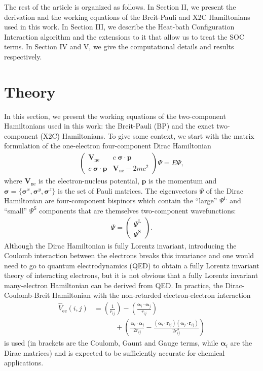 \documentclass[10pt,aps,prb,twocolumn,amsmath,amssymb,superscriptaddress]{revtex4-1}
\renewcommand\b[1]{\ensuremath{\mathbf{#1}}}
\newcommand\B[1]  {\ensuremath{\pmb #1}}
\newcommand\equ[2]{\begin{align}#2\label{#1}\end{align}}
\begin{document}
The rest of the article is organized as follows.
In Section II, we present the derivation and the working equations of the Breit-Pauli and X2C Hamiltonians used in this work. In Section III, we describe the Heat-bath Configuration Interaction algorithm and the extensions to it that allow us to treat the SOC terms.
In Section IV and V, we give the computational details and results respectively.%

\section{Theory}

In this section, we present the working equations of the two-component Hamiltonians used in this work: the Breit-Pauli (BP) and the exact two-component (X2C) Hamiltonians.
To give some context, we start with the matrix formulation of the one-electron four-component Dirac Hamiltonian
\equ{eq:Dirac}{
   \begin{pmatrix}
       \b{V}_\text{ne} & c\;\B{\sigma}\cdot\b{p} \\
       c\;\B{\sigma}\cdot\b{p} & \b{V}_\text{ne}- 2 m c^2
   \end{pmatrix}
   \Psi
   =E\Psi
,}
where $\b{V}_\text{ne}$ is the  electron-nucleus potential,
$\b{p}$ is the momentum and $\B{\sigma}=\{\B{\sigma}^x,\B{\sigma}^y,\B{\sigma}^z\}$ is the set of Pauli matrices.
The eigenvectors $\Psi$ of the Dirac Hamiltonian are four-component bispinors which contain the
``large'' $\Psi^\text{L}$ and ``small'' $\Psi^\text{S}$ components that are themselves two-component wavefunctions:
\equ{ }{
    \Psi=\begin{pmatrix}\Psi^\text{L}\\\Psi^\text{S}\end{pmatrix}
.}
Although the Dirac Hamiltonian is fully Lorentz invariant, introducing the Coulomb interaction between the electrons breaks this invariance and one would need to go to quantum electrodynamics (QED) to obtain a fully Lorentz invariant theory of interacting electrons, but it is not obvious that a fully Lorentz invariant many-electron Hamiltonian can be derived from QED. In practice, the Dirac-Coulomb-Breit Hamiltonian with the  non-retarded electron-electron interaction
\begin{align}
\hat{V}_\text{ee}(i,j) &= \left(\frac{1}{r_{ij}}\right) - \left(\frac{\B{\alpha}_i\cdot\B{\alpha}_j}{r_{ij}}\right) 
\nonumber\\&\qquad\quad+ \left(\frac{\B{\alpha}_i\cdot\B{\alpha}_j}{2r_{ij}} - \frac{(\B{\alpha}_i\cdot\b{r}_{ij})(\B{\alpha}_j\cdot\b{r}_{ij})}{2r_{ij}^3} \right)\label{eq:cgb}
\end{align}
is used (in brackets are the Coulomb, Gaunt and Gauge terms, while $\B{\alpha}_i$ are the Dirac matrices) and is expected to be sufficiently accurate for chemical applications. 
\end{document}
